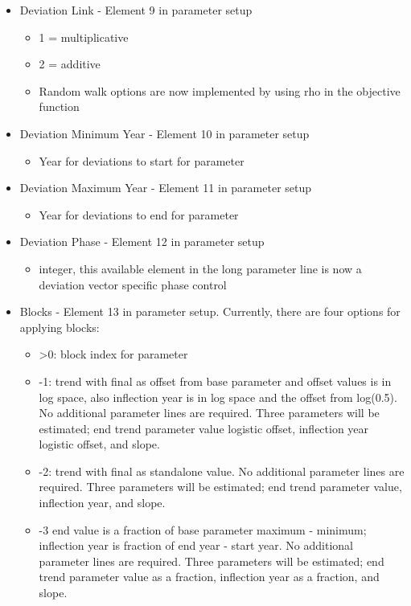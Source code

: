 \begin{itemize}
	\item Deviation Link - Element 9 in parameter setup
	\begin{itemize}
		\item 1 = multiplicative
		\item 2 = additive
		\item Random walk options are now implemented by using rho in the objective function
	\end{itemize}
	
	\item Deviation  Minimum Year - Element 10 in parameter setup
		\begin{itemize}
			\item Year for deviations to start for parameter
		\end{itemize}
		
	\item Deviation  Maximum Year - Element 11 in parameter setup
		\begin{itemize}
			\item Year for deviations to end for parameter
		\end{itemize}
		
	\item Deviation Phase - Element 12 in parameter setup
		\begin{itemize}
			\item integer, this available element in the long parameter line is now a deviation vector specific phase control
		\end{itemize}
		
	\item Blocks - Element 13 in parameter setup. Currently, there are four options for applying blocks:
		\begin{itemize}
			\item >0: block index for parameter
			\item -1: trend with final as offset from base parameter and offset values is in log space, also inflection year is in log space and the offset from log(0.5). No additional parameter lines are required.  Three parameters will be estimated; end trend parameter value logistic offset, inflection year logistic offset, and slope.
			\item -2: trend with final as standalone value. No additional parameter lines are required. Three parameters will be estimated; end trend parameter value, inflection year, and slope.
			\item -3 end value is a fraction of base parameter maximum - minimum; inflection year is fraction of end year - start year. No additional parameter lines are required. Three parameters will be estimated; end trend parameter value as a fraction, inflection year as a fraction, and slope.
		\end{itemize}
		

\end{itemize}
